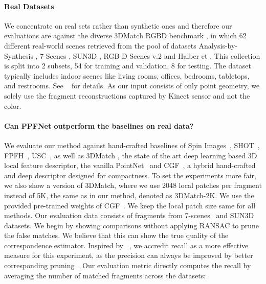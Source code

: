 \documentclass[10pt,twocolumn,letterpaper]{article}
\theoremstyle{break}
\begin{document}
\paragraph{Real Datasets}
We concentrate on real sets rather than synthetic ones and therefore our evaluations are against the diverse 3DMatch RGBD benchmark \cite{zeng20163dmatch}, in which 62 different real-world scenes retrieved from the pool of datasets Analysis-by-Synthesis \cite{valentin2016learning}, 7-Scenes \cite{shotton2013scene}, SUN3D \cite{xiao2013sun3d}, RGB-D Scenes v.2 \cite{lai2014unsupervised} and Halber et \cite{halber2016structured}. This collection is split into 2 subsets, 54 for training and validation, 8 for testing. The dataset typically includes indoor scenes like living rooms, offices, bedrooms, tabletops, and restrooms. See ~\cite{zeng20163dmatch} for details. As our input consists of only point geometry, we solely use the fragment reconstructions captured by Kinect sensor and not the color. 

\paragraph{Can PPFNet outperform the baselines on real data?}
We evaluate our method against hand-crafted baselines of Spin Images~\cite{johnson1999using}, SHOT~\cite{salti2014shot}, FPFH~\cite{rusu2009fast}, USC~\cite{tombari2010unique}, as well as 3DMatch \cite{zeng20163dmatch}, the state of the art deep learning based 3D local feature descriptor, the vanilla PointNet~\cite{qi2016pointnet} and CGF~\cite{Khoury_2017_ICCV}, a hybrid hand-crafted and deep descriptor designed for compactness. To set the experiments more fair, we also show a version of 3DMatch, where we use 2048 local patches per fragment instead of 5K, the same as in our method, denoted as 3DMatch-2K. We use the provided pre-trained weights of CGF~\cite{Khoury_2017_ICCV}. We keep the local patch size same for all methods. Our evaluation data consists of fragments from 7-scenes~\cite{shotton2013scene} and SUN3D~\cite{xiao2013sun3d} datasets. We begin by showing comparisons without applying RANSAC to prune the false matches. We believe that this can show the true quality of the correspondence estimator. Inspired by ~\cite{Khoury_2017_ICCV}, we accredit recall as a more effective measure for this experiment, as the precision can always be improved by better corresponding pruning~\cite{chin2015efficient,campbell2017globally}. Our evaluation metric directly computes the recall by averaging the number of matched fragments across the datasets:
\vspace{-0.5mm}
\end{document}
